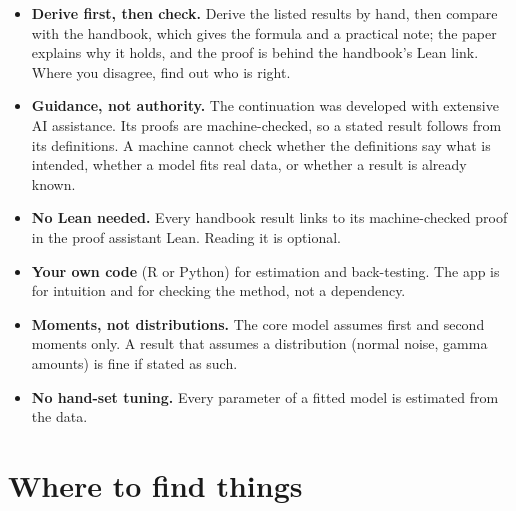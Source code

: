 \documentclass[10pt]{article}
\begin{document}
\begin{itemize}\setlength{\itemsep}{1pt}
  \item \textbf{Derive first, then check.} Derive the listed results by hand, then compare with the
    handbook, which gives the formula and a practical note; the paper explains why it holds, and
    the proof is behind the handbook's Lean link. Where you disagree, find out who is right.
  \item \textbf{Guidance, not authority.} The continuation was developed with extensive AI
    assistance. Its proofs are machine-checked, so a stated result follows from its definitions. A
    machine cannot check whether the definitions say what is intended, whether a model fits real
    data, or whether a result is already known.
  \item \textbf{No Lean needed.} Every handbook result links to its machine-checked proof in the
    proof assistant Lean. Reading it is optional.
  \item \textbf{Your own code} (R or Python) for estimation and back-testing. The app is for
    intuition and for checking the method, not a dependency.
  \item \textbf{Moments, not distributions.} The core model assumes first and second moments only.
    A result that assumes a distribution (normal noise, gamma amounts) is fine if stated as such.
  \item \textbf{No hand-set tuning.} Every parameter of a fitted model is estimated from the data.
\end{itemize}

\section{Where to find things}\label{sec:where}
\end{document}
